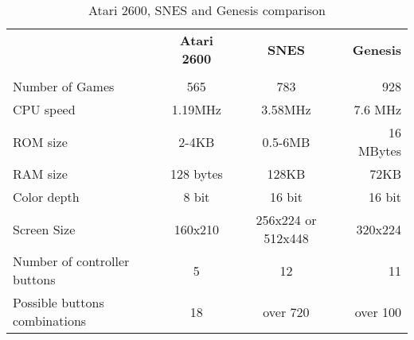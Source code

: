 \documentclass{article}
\begin{document}
\begin{table}[h!]
\centering{}
\caption{Atari 2600, SNES and Genesis comparison}
\label{table:atariSnes}
\begin{tabular}{lccr}
\hline
 &\textbf{Atari 2600} &\textbf{SNES}&\textbf{Genesis}   \\ \tabularnewline
 \hline
 \hline
Number of Games &565 &783 &928  \\ 
\hline
CPU speed &1.19MHz  &3.58MHz &7.6 MHz   \\  \hline
ROM size &2-4KB  &0.5-6MB  &16 MBytes   \\  \hline
RAM size &128 bytes  &128KB  &72KB    \\ 
 \hline
Color depth &8 bit  &16 bit &16 bit  \\  \hline
Screen Size &160x210  &256x224 or 512x448 &320x224   \\  \hline
Number of controller buttons &5  &12 &11  \\  \hline
Possible buttons combinations &18  &over 720  &over 100   \\  \hline
\end{tabular}
\end{table}
\end{document}
